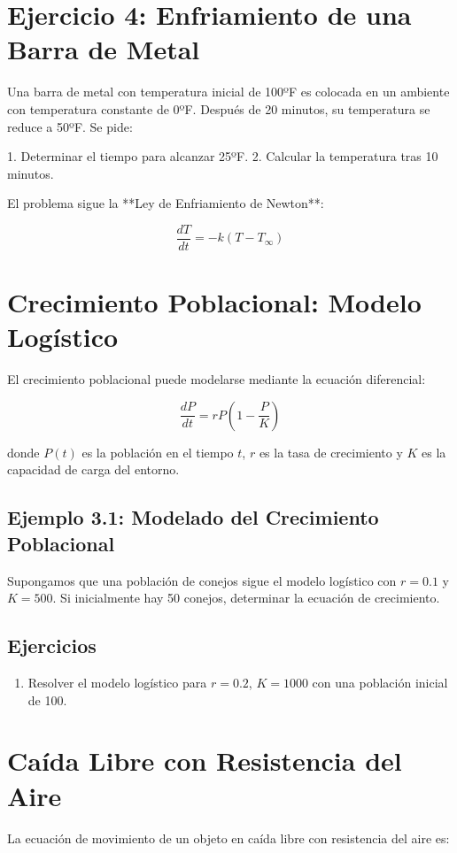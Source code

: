 \section*{Ejercicio 4: Enfriamiento de una Barra de Metal}

Una barra de metal con temperatura inicial de 100ºF es colocada en un ambiente con temperatura constante de 0ºF. Después de 20 minutos, su temperatura se reduce a 50ºF. Se pide:

1. Determinar el tiempo para alcanzar 25ºF.
2. Calcular la temperatura tras 10 minutos.

El problema sigue la **Ley de Enfriamiento de Newton**:

\[
\frac{dT}{dt} = -k(T - T_{\infty})
\]

\section{Crecimiento Poblacional: Modelo Logístico}
El crecimiento poblacional puede modelarse mediante la ecuación diferencial:

\begin{equation}
\frac{dP}{dt} = r P \left( 1 - \frac{P}{K} \right)
\end{equation}

donde \( P(t) \) es la población en el tiempo \( t \), \( r \) es la tasa de crecimiento y \( K \) es la capacidad de carga del entorno.

\subsection*{Ejemplo 3.1: Modelado del Crecimiento Poblacional}
Supongamos que una población de conejos sigue el modelo logístico con \( r = 0.1 \) y \( K = 500 \). Si inicialmente hay 50 conejos, determinar la ecuación de crecimiento.

\subsection*{Ejercicios}
\begin{enumerate}
    \item Resolver el modelo logístico para \( r = 0.2 \), \( K = 1000 \) con una población inicial de 100.
\end{enumerate}

\section{Caída Libre con Resistencia del Aire}
La ecuación de movimiento de un objeto en caída libre con resistencia del aire es:

